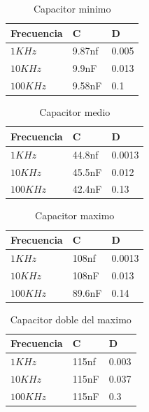 \documentclass[../../main.tex]{subfiles}
\begin{document}
\begin{table}[H]
\begin{center}
\begin{tabular}{|l|l|l|}
\hline
 Frecuencia&C&D\\
\hline \hline

$ 1KHz$ &9.87nf&0.005  \\ \hline
$ 10KHz$  & 9.9nF&0.013  \\ \hline
$ 100KHz$  &9.58nF &0.1  \\ \hline

\end{tabular}
\caption{Capacitor minimo } 
\end{center}
\end{table}
\begin{table}[H]
\begin{center}
\begin{tabular}{|l|l|l|}
\hline
 Frecuencia&C&D\\
\hline \hline

$ 1KHz$ &44.8nf&0.0013  \\ \hline
$ 10KHz$  & 45.5nF&0.012 \\ \hline
$ 100KHz$  &42.4nF &0.13  \\ \hline

\end{tabular}
\caption{Capacitor medio } 
\end{center}
\end{table}

\begin{table}[H]
\begin{center}
\begin{tabular}{|l|l|l|}
\hline
 Frecuencia&C&D\\
\hline \hline

$ 1KHz$ &108nf&0.0013  \\ \hline
$ 10KHz$  & 108nF&0.013  \\ \hline
$ 100KHz$  &89.6nF & 0.14 \\ \hline

\end{tabular}
\caption{Capacitor maximo } 
\end{center}
\end{table}

\begin{table}[H]
\begin{center}
\begin{tabular}{|l|l|l|}
\hline
 Frecuencia&C&D\\
\hline \hline

$ 1KHz$ &115nf&0.003  \\ \hline
$ 10KHz$  & 115nF&0.037  \\ \hline
$ 100KHz$  &115nF &0.3  \\ \hline

\end{tabular}
\caption{Capacitor doble del maximo } 
\end{center}
\end{table}
\end{document}
